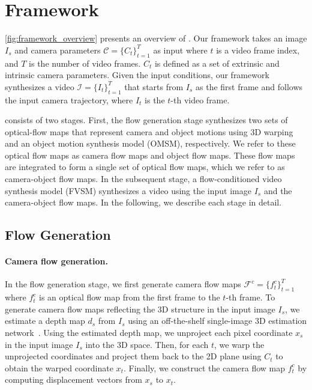 
\section{\MethodName{} Framework}
\label{sec:method}
\cref{fig:framework_overview} presents an overview of \MethodName{}.
Our framework takes an image $I_s$ and camera parameters $\mathcal{C}=\{C_t\}_{t=1}^T$ as input where $t$ is a video frame index, and $T$ is the number of video frames.
$C_t$ is defined as a set of extrinsic and intrinsic camera parameters.
Given the input conditions, our framework synthesizes a video $\mathcal{I}=\{I_t\}^{T}_{t=1}$ that starts from $I_s$ as the first frame and follows the input camera trajectory, where $I_t$ is the $t$-th video frame.


\MethodName{} consists of two stages. First, the flow generation stage synthesizes two sets of optical-flow maps that represent camera and object motions using 3D warping and an object motion synthesis model (OMSM), respectively. We refer to these optical flow maps as camera flow maps and object flow maps.
These flow maps are integrated to form a single set of optical flow maps, which we refer to as camera-object flow maps. 
In the subsequent stage, a flow-conditioned video synthesis model (FVSM) synthesizes a video using the input image $I_s$ and the camera-object flow maps. In the following, we describe each stage in detail.


\subsection{Flow Generation}
\label{sec:flow_generation}
\paragraph{Camera flow generation.}
In the flow generation stage, we first generate camera flow maps $\mathcal{F}^c=\{f^c_t\}_{t=1}^{T}$ where $f^c_t$ is an optical flow map from the first frame to the $t$-th frame.
To generate camera flow maps reflecting the 3D structure in the input image $I_s$, we estimate a depth map $d_s$ from $I_s$ using an off-the-shelf single-image 3D estimation network~\cite{yang2024depth}.
Using the estimated depth map, we unproject each pixel coordinate $x_s$ in the input image $I_s$ into the 3D space.
Then, for each $t$, we warp the unprojected coordinates and project them back to the 2D plane using $C_t$ to obtain the warped coordinate $x_t$.
Finally, we construct the camera flow map $f_t^c$ by computing displacement vectors from $x_s$ to $x_t$.



